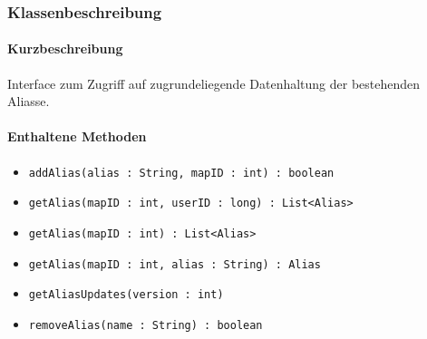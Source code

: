 \subsubsection*{Klassenbeschreibung}%
\paragraph*{Kurzbeschreibung}
Interface zum Zugriff auf zugrundeliegende Datenhaltung der bestehenden Aliasse.
\paragraph*{Enthaltene Methoden}
\begin{itemize}
    \item \texttt{addAlias(alias : String, mapID : int) : boolean}
    \item \texttt{getAlias(mapID : int, userID : long) : List<Alias>}
    \item \texttt{getAlias(mapID : int) : List<Alias>}
    \item \texttt{getAlias(mapID : int, alias : String) : Alias}
    \item \texttt{getAliasUpdates(version : int)}
    \item \texttt{removeAlias(name : String) : boolean}
\end{itemize}
